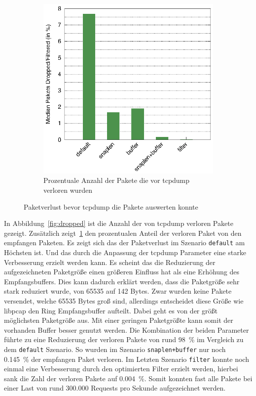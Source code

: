 \begin{figure}
\begin{subfigure}[b]{0.5\textwidth}
    \includegraphics[width=\textwidth]{images/dropped-percentage}
    \caption{Prozentuale Anzahl der Pakete die vor tcpdump verloren wurden}\label{fig:dropped-percentage}
  \end{subfigure}
\caption{Paketverlust bevor tcpdump die Pakete auswerten konnte}\label{fig:results}
\end{figure}

In Abbildung~\ref{fig:dropped} ist die Anzahl der von tcpdump verloren Pakete
gezeigt. Zusätzlich zeigt~\ref{fig:dropped-percentage} den prozentualen Anteil
der verloren Paket von den empfangen Paketen.  Es zeigt sich das der
Paketverlust im Szenario \texttt{default} am Höchsten ist. Und das durch die
Anpassung der tcpdump Parameter eine starke Verbesserung erzielt werden kann.
Es scheint das die Reduzierung der aufgezeichneten Paketgröße einen größeren
Einfluss hat als eine Erhöhung des Empfangsbuffers. Dies kann dadurch erklärt
werden, dass die Paketgröße sehr stark reduziert wurde, von 65535 auf 142
Bytes. Zwar wurden keine Pakete versendet, welche 65535 Bytes groß sind,
allerdings entscheidet diese Größe wie libpcap den Ring Empfangsbuffer
aufteilt. Dabei geht es von der größt möglichsten Paketgröße aus. Mit einer
geringen Paketgrößte kann somit der vorhanden Buffer besser genutzt werden.
Die Kombination der beiden Parameter führte zu eine Reduzierung der verloren
Pakete von rund 98~\% im Vergleich zu dem \texttt{default} Szenario. So wurden
im Szenario \texttt{snaplen+buffer} nur noch 0.145~\% der empfangen Paket
verloren. Im Letzten Szenario \texttt{filter} konnte noch einmal eine
Verbesserung durch den optimierten Filter erzielt werden, hierbei sank die Zahl
der verloren Pakete auf 0.004~\%. Somit konnten fast alle Pakete bei einer Last
von rund 300.000 Requests pro Sekunde aufgezeichnet werden.
